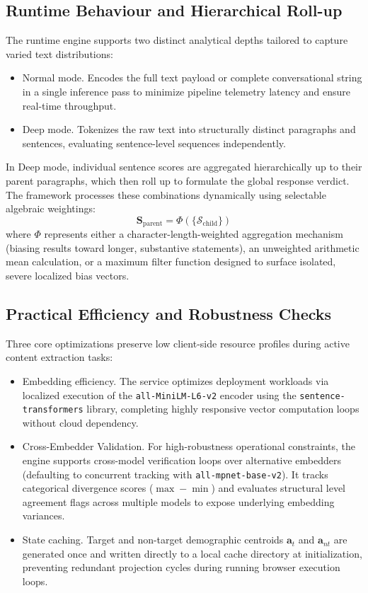 \documentclass[runningheads]{llncs}
\begin{document}
\subsection{Runtime Behaviour and Hierarchical Roll-up}
\label{subsec:runtime}

The runtime engine supports two distinct analytical depths tailored to capture varied text distributions:
\begin{itemize}
  \item Normal mode. Encodes the full text payload or complete conversational string in a single inference pass to minimize pipeline telemetry latency and ensure real-time throughput.
  \item Deep mode. Tokenizes the raw text into structurally distinct paragraphs and sentences, evaluating sentence-level sequences independently.
\end{itemize}

In Deep mode, individual sentence scores are aggregated hierarchically up to their parent paragraphs, which then roll up to formulate the global response verdict. The framework processes these combinations dynamically using selectable algebraic weightings:
\begin{equation}
  \mathbf{S}_{\mathrm{parent}} = \Phi(\{\mathcal{S}_{\mathrm{child}}\})
\end{equation}
where $\Phi$ represents either a character-length-weighted aggregation mechanism (biasing results toward longer, substantive statements), an unweighted arithmetic mean calculation, or a maximum filter function designed to surface isolated, severe localized bias vectors.

\subsection{Practical Efficiency and Robustness Checks}
\label{subsec:efficiency}

Three core optimizations preserve low client-side resource profiles during active content extraction tasks:
\begin{itemize}
  \item Embedding efficiency. The service optimizes deployment workloads via localized execution
    of the \texttt{all-MiniLM-L6-v2} encoder using the \texttt{sentence-transformers} library, completing highly responsive vector computation loops without cloud dependency.
  \item Cross-Embedder Validation. For high-robustness operational constraints, the engine supports cross-model verification loops over alternative embedders (defaulting to concurrent tracking with \texttt{all-mpnet-base-v2}). It tracks categorical divergence scores ($\max - \min$) and evaluates structural level agreement flags across multiple models to expose underlying embedding variances.
  \item State caching. Target and non-target demographic centroids $\mathbf{a}_t$ and $\mathbf{a}_{nt}$ are generated once and written directly to a local cache directory at initialization, preventing redundant projection cycles during running browser execution loops.
\end{itemize}
\end{document}
